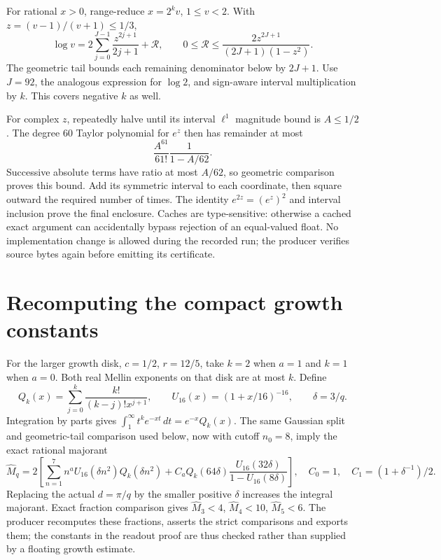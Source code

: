 \documentclass[11pt,oneside,openany]{book}
\theoremstyle{definition}\newtheorem{definition}[theorem]{Definition}
\theoremstyle{remark}\newtheorem{remark}[theorem]{Remark}
\begin{document}
For rational $x>0$, range-reduce $x=2^kv$, $1\le v<2$. With
$z=(v-1)/(v+1)\le1/3$,
\[
 \log v=2\sum_{j=0}^{J-1}\frac{z^{2j+1}}{2j+1}+\mathcal R,
 \qquad 0\le\mathcal R\le
 \frac{2z^{2J+1}}{(2J+1)(1-z^2)}.
\]
The geometric tail bounds each remaining denominator below by $2J+1$.
Use $J=92$, the analogous expression for $\log2$, and sign-aware interval
multiplication by $k$. This covers negative $k$ as well.

For complex $z$, repeatedly halve until its interval $\ell^1$ magnitude
bound is $A\le1/2$. The degree $60$ Taylor polynomial for $e^z$ then has remainder
at most
\[
 \frac{A^{61}}{61!}\frac1{1-A/62}.
\]
Successive absolute terms have ratio at most $A/62$, so geometric comparison
proves this bound. Add its symmetric interval to each coordinate, then square
outward the required number of times. The identity $e^{2z}=(e^z)^2$ and
interval inclusion prove the final enclosure. Caches are type-sensitive:
otherwise a cached exact argument can accidentally bypass rejection of an
equal-valued float. No implementation change is allowed during the recorded run;
the producer verifies source bytes again before emitting its certificate.

\section{Recomputing the compact growth constants}
For the larger growth disk, $c=1/2$, $r=12/5$, take $k=2$ when $a=1$
and $k=1$ when $a=0$. Both real Mellin exponents on that disk are at most
$k$. Define
\[
 Q_k(x)=\sum_{j=0}^k\frac{k!}{(k-j)!x^{j+1}},\qquad
 U_{16}(x)=(1+x/16)^{-16},\qquad \delta=3/q.
\]
Integration by parts gives
$\int_1^\infty t^ke^{-xt}\,dt=e^{-x}Q_k(x)$.
The same Gaussian split and geometric-tail comparison used below, now
with cutoff $n_0=8$, imply the exact rational majorant
\[
 \widehat M_q=2\left[
 \sum_{n=1}^{7}n^aU_{16}(\delta n^2)Q_k(\delta n^2)
 +C_aQ_k(64\delta)\frac{U_{16}(32\delta)}{1-U_{16}(8\delta)}\right],
 \quad C_0=1,\quad C_1=(1+\delta^{-1})/2.
\]
Replacing the actual $d=\pi/q$ by the smaller positive $\delta$ increases
the integral majorant. Exact fraction comparison gives
$\widehat M_3<4$, $\widehat M_4<10$, $\widehat M_5<6$.
The producer recomputes these fractions, asserts the strict comparisons and
exports them; the constants in the readout proof are thus checked rather
than supplied by a floating growth estimate.
\end{document}
